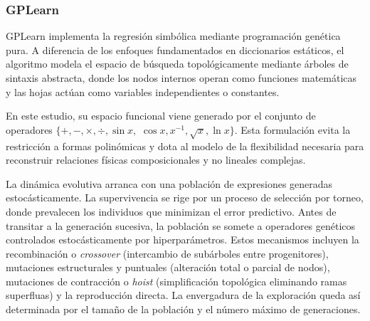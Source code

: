 \documentclass[11pt, a4paper]{article}
\begin{document}
\subsubsection{GPLearn}
GPLearn \cite{stephens2016gplearn} implementa la regresión simbólica mediante programación genética pura. A diferencia de los enfoques fundamentados en diccionarios estáticos, el algoritmo modela el espacio de búsqueda topológicamente mediante árboles de sintaxis abstracta, donde los nodos internos operan como funciones matemáticas y las hojas actúan como variables independientes o constantes. 

En este estudio, su espacio funcional viene generado por el conjunto de operadores $\{+, -, \times, \div, \sin x,$ $\cos x, x^{-1}, \sqrt{x}, \ln x\}$. Esta formulación evita la restricción a formas polinómicas y dota al modelo de la flexibilidad necesaria para reconstruir relaciones físicas composicionales y no lineales complejas.

La dinámica evolutiva arranca con una población de expresiones generadas estocásticamente. La supervivencia se rige por un proceso de selección por torneo, donde prevalecen los individuos que minimizan el error predictivo. Antes de transitar a la generación sucesiva, la población se somete a operadores genéticos controlados estocásticamente por hiperparámetros. Estos mecanismos incluyen la recombinación o \textit{crossover} (intercambio de subárboles entre progenitores), mutaciones estructurales y puntuales (alteración total o parcial de nodos), mutaciones de contracción o \textit{hoist} (simplificación topológica eliminando ramas superfluas) y la reproducción directa. La envergadura de la exploración queda así determinada por el tamaño de la población y el número máximo de generaciones.
\end{document}
